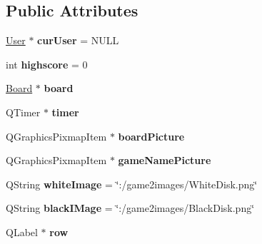 \subsection*{Public Attributes}
\begin{DoxyCompactItemize}
\item 
\hypertarget{classGame2scene_ad29d2d44e8aed6f12220d80b39982376}{\hyperlink{classUser}{User} $\ast$ {\bfseries cur\-User} = N\-U\-L\-L}\label{classGame2scene_ad29d2d44e8aed6f12220d80b39982376}

\item 
\hypertarget{classGame2scene_a86b35242a3f532c24763bb83f2f586ea}{int {\bfseries highscore} = 0}\label{classGame2scene_a86b35242a3f532c24763bb83f2f586ea}

\item 
\hypertarget{classGame2scene_a3605ef4645d5cf2048a3ea53ff8f19fa}{\hyperlink{classBoard}{Board} $\ast$ {\bfseries board}}\label{classGame2scene_a3605ef4645d5cf2048a3ea53ff8f19fa}

\item 
\hypertarget{classGame2scene_a49d8afe92b6338c8adc1309546670e79}{Q\-Timer $\ast$ {\bfseries timer}}\label{classGame2scene_a49d8afe92b6338c8adc1309546670e79}

\item 
\hypertarget{classGame2scene_a71f9e685aa7a31054d49772c49470d06}{Q\-Graphics\-Pixmap\-Item $\ast$ {\bfseries board\-Picture}}\label{classGame2scene_a71f9e685aa7a31054d49772c49470d06}

\item 
\hypertarget{classGame2scene_ab4d95cabb6503aa6230209b87e0d8c44}{Q\-Graphics\-Pixmap\-Item $\ast$ {\bfseries game\-Name\-Picture}}\label{classGame2scene_ab4d95cabb6503aa6230209b87e0d8c44}

\item 
\hypertarget{classGame2scene_a8a3827271508af74fd6d8afc1a8d5e25}{Q\-String {\bfseries white\-Image} = \char`\"{}\-:/game2images/White\-Disk.\-png\char`\"{}}\label{classGame2scene_a8a3827271508af74fd6d8afc1a8d5e25}

\item 
\hypertarget{classGame2scene_a0c958503508709dc05815acc6b7465e8}{Q\-String {\bfseries black\-I\-Mage} = \char`\"{}\-:/game2images/Black\-Disk.\-png\char`\"{}}\label{classGame2scene_a0c958503508709dc05815acc6b7465e8}

\item 
\hypertarget{classGame2scene_a67ab6963073d76ed6d8d065fd1014e8c}{Q\-Label $\ast$ {\bfseries row}}\label{classGame2scene_a67ab6963073d76ed6d8d065fd1014e8c}


\end{DoxyCompactItemize}
